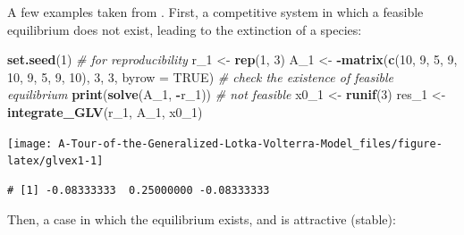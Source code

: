 \documentclass[]{book}
\newenvironment{Shaded}{\begin{snugshade}}{\end{snugshade}}
\newcommand{\CommentTok}[1]{\textcolor[rgb]{0.56,0.35,0.01}{\textit{#1}}}
\newcommand{\DataTypeTok}[1]{\textcolor[rgb]{0.13,0.29,0.53}{#1}}
\newcommand{\DecValTok}[1]{\textcolor[rgb]{0.00,0.00,0.81}{#1}}
\newcommand{\KeywordTok}[1]{\textcolor[rgb]{0.13,0.29,0.53}{\textbf{#1}}}
\newcommand{\NormalTok}[1]{#1}
\newcommand{\OperatorTok}[1]{\textcolor[rgb]{0.81,0.36,0.00}{\textbf{#1}}}
\newcommand{\OtherTok}[1]{\textcolor[rgb]{0.56,0.35,0.01}{#1}}
\newcommand{\StringTok}[1]{\textcolor[rgb]{0.31,0.60,0.02}{#1}}
\begin{document}
A few examples taken from \citet{barabas2016effect}. First, a competitive system in which a feasible equilibrium does not exist, leading to the extinction of a species:

\begin{Shaded}
\begin{Highlighting}[]
\KeywordTok{set.seed}\NormalTok{(}\DecValTok{1}\NormalTok{) }\CommentTok{# for reproducibility}
\NormalTok{r_}\DecValTok{1}\NormalTok{ <-}\StringTok{ }\KeywordTok{rep}\NormalTok{(}\DecValTok{1}\NormalTok{, }\DecValTok{3}\NormalTok{)}
\NormalTok{A_}\DecValTok{1}\NormalTok{ <-}\StringTok{ }\OperatorTok{-}\KeywordTok{matrix}\NormalTok{(}\KeywordTok{c}\NormalTok{(}\DecValTok{10}\NormalTok{, }\DecValTok{9}\NormalTok{, }\DecValTok{5}\NormalTok{, }
                 \DecValTok{9}\NormalTok{, }\DecValTok{10}\NormalTok{, }\DecValTok{9}\NormalTok{, }
                 \DecValTok{5}\NormalTok{, }\DecValTok{9}\NormalTok{, }\DecValTok{10}\NormalTok{), }\DecValTok{3}\NormalTok{, }\DecValTok{3}\NormalTok{, }\DataTypeTok{byrow =} \OtherTok{TRUE}\NormalTok{)}
\CommentTok{# check the existence of feasible equilibrium}
\KeywordTok{print}\NormalTok{(}\KeywordTok{solve}\NormalTok{(A_}\DecValTok{1}\NormalTok{, }\OperatorTok{-}\NormalTok{r_}\DecValTok{1}\NormalTok{)) }\CommentTok{# not feasible}
\NormalTok{x0_}\DecValTok{1}\NormalTok{ <-}\StringTok{ }\KeywordTok{runif}\NormalTok{(}\DecValTok{3}\NormalTok{)}
\NormalTok{res_}\DecValTok{1}\NormalTok{ <-}\StringTok{ }\KeywordTok{integrate_GLV}\NormalTok{(r_}\DecValTok{1}\NormalTok{, A_}\DecValTok{1}\NormalTok{, x0_}\DecValTok{1}\NormalTok{)}
\end{Highlighting}
\end{Shaded}

\begin{center}\texttt{[image: A-Tour-of-the-Generalized-Lotka-Volterra-Model\_files/figure-latex/glvex1-1]} \end{center}

\begin{verbatim}
# [1] -0.08333333  0.25000000 -0.08333333
\end{verbatim}

Then, a case in which the equilibrium exists, and is attractive (stable):
\end{document}
